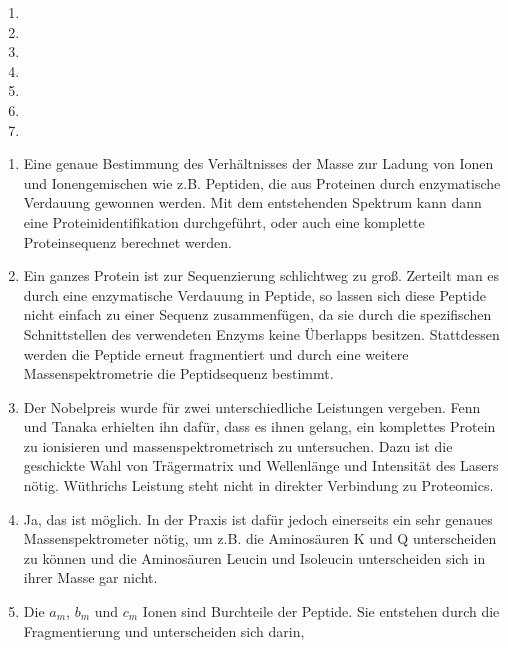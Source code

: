 \documentclass{homework}
\date{Montag, dem 28. Januar 2013}
\author{Stefan Meißner (4279113) und Niels Hoppe (4356370)}
\begin{document}
\maketitle
\begin{enumerate} 

\begin{enumerate}
\item 
\item 
\item 
\item 
\item 
\item 
\item 
\end{enumerate}


\begin{enumerate}
\item
Eine genaue Bestimmung des Verhältnisses der Masse zur Ladung von Ionen und Ionengemischen wie z.B. Peptiden,
die aus Proteinen durch enzymatische Verdauung gewonnen werden.
Mit dem entstehenden Spektrum kann dann eine Proteinidentifikation durchgeführt,
oder auch eine komplette Proteinsequenz berechnet werden.
\item
Ein ganzes Protein ist zur Sequenzierung schlichtweg zu groß.
Zerteilt man es durch eine enzymatische Verdauung in Peptide,
so lassen sich diese Peptide nicht einfach zu einer Sequenz zusammenfügen,
da sie durch die spezifischen Schnittstellen des verwendeten Enzyms keine Überlapps besitzen.
Stattdessen werden die Peptide erneut fragmentiert und durch eine weitere Massenspektrometrie die Peptidsequenz bestimmt.
\item
Der Nobelpreis wurde für zwei unterschiedliche Leistungen vergeben.
Fenn und Tanaka erhielten ihn dafür, dass es ihnen gelang,
ein komplettes Protein zu ionisieren und massenspektrometrisch zu untersuchen.
Dazu ist die geschickte Wahl von Trägermatrix und Wellenlänge und Intensität des Lasers nötig.
Wüthrichs Leistung steht nicht in direkter Verbindung zu Proteomics.
\item
Ja, das ist möglich.
In der Praxis ist dafür jedoch einerseits ein sehr genaues Massenspektrometer nötig,
um z.B. die Aminosäuren K und Q unterscheiden zu können und die Aminosäuren Leucin und Isoleucin unterscheiden sich in ihrer Masse gar nicht.
\item Die $a_m$, $b_m$ und $c_m$ Ionen sind Burchteile der Peptide.
Sie entstehen durch die Fragmentierung und unterscheiden sich darin,

\end{enumerate}
\end{enumerate}
\end{document}
